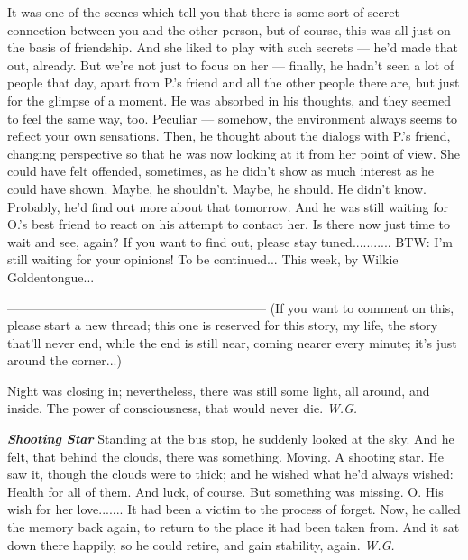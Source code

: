 It was one of the scenes which tell you that there is some sort of secret connection between you and the other person, but of course, this was all just on the basis of friendship. And she liked to play with such secrets --- he'd made that out, already. 
But we're not just to focus on her --- finally, he hadn't seen a lot of people that day, apart from P.'s friend and all the other people there are, but just for the glimpse of a moment. 
He was absorbed in his thoughts, and they seemed to feel the same way, too. 
Peculiar --- somehow, the environment always seems to reflect your own sensations. 
Then, he thought about the dialogs with P.'s friend, changing perspective so that he was now looking at it from her point of view. 
She could have felt offended, sometimes, as he didn't show as much interest as he could have shown. Maybe, he shouldn't. Maybe, he should. 
He didn't know. 
Probably, he'd find out more about that tomorrow. 
And he was still waiting for O.'s best friend to react on his attempt to contact her. 
Is there now just time to wait and see, again?
If you want to find out, please stay tuned...........
BTW: I'm still waiting for your opinions!
To be continued...
This week, by Wilkie Goldentongue...

--------------------------------------------------------------
(If you want to comment on this, please start a new thread; this one is reserved for this story, my life, the story that'll never end, while the end is still near, coming nearer every minute; it's just around the corner...)

Night was closing in; 
nevertheless, there was still some light, 
all around, 
and inside. 
The power of consciousness, 
that would never die. 
\emph{W.G.}

\emph{\textbf{Shooting Star}}
Standing at the bus stop, 
he suddenly looked at the sky. 
And he felt, that behind the clouds, 
there was something. 
Moving. 
A shooting star. 
He saw it, though the clouds were to thick; 
and he wished what he'd always wished: 
Health for all of them. 
And luck, of course. 
But something was missing. 
O. 
His wish for her love.......
It had been a victim to the process 
of forget. 
Now, he called the memory back again, 
to return 
to the place 
it had been taken from. 
And it sat down there happily, 
so he could retire, 
and gain stability, 
again. 
\emph{W.G.}
